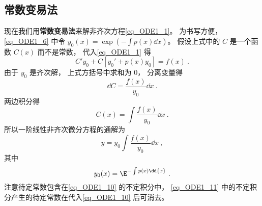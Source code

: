 \subsection{常数变易法}

现在我们用\textbf{常数变易法}来解非齐次方程\autoref{eq_ODE1_1}。 为书写方便， \autoref{eq_ODE1_6} 中令 $y_0(x) = \exp(-\int p(x) \dd{x})$。 假设上式中的 $C$ 是一个函数 $C(x)$ 而不是常数， 代入\autoref{eq_ODE1_1} 得
\begin{equation}
C'y_0 + C[y_0' + p(x)y_0] = f(x)~.
\end{equation}
由于 $y_0$ 是齐次解， 上式方括号中求和为 0， 分离变量得
\begin{equation}
\dd{C}= \frac{f(x)}{y_0} \dd{x}~.
\end{equation}
两边积分得
\begin{equation}
C(x) = \int \frac{f(x)}{y_0} \dd{x}~.
\end{equation}
所以一阶线性非齐次微分方程的通解为
\begin{equation}\label{eq_ODE1_10}
y = y_0  \int \frac{f(x)}{y_0} \dd{x}~,
\end{equation}
其中
\begin{equation}\label{eq_ODE1_11}
y_0(x) = \E^{-\int p(x) \dd{x}}~.
\end{equation}
注意待定常数包含在\autoref{eq_ODE1_10} 的不定积分中， \autoref{eq_ODE1_11} 中的不定积分产生的待定常数在代入\autoref{eq_ODE1_10} 后可消去。
